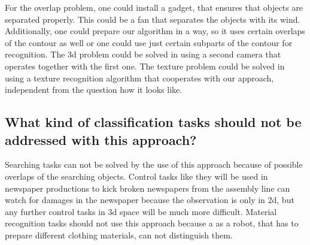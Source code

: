 \documentclass[a4paper,headings=small]{scrartcl}
\numberwithin{equation}{section} %
\numberwithin{figure}{section}   %
\begin{document}
For the overlap problem, one could install a gadget, that ensures that objects are separated properly.
This could be a fan that separates the objects with its wind. 
Additionally, one could prepare our algorithm in a way, so it uses certain overlaps of the 
contour as well or one could use just certain subparts of the contour for recognition.
The 3d problem could be solved in using a second camera that operates together with the first one.
The texture problem could be solved in using a texture recognition algorithm that cooperates with
our approach, independent from the question how it looks like.

\subsection{What kind of classification tasks should not be addressed with
this approach?}

Searching tasks can not be solved by the use of this approach because of possible overlaps
of the searching objects.
Control tasks like they will be used in newspaper productions to kick broken newspapers from
the assembly line can watch for damages in the newspaper because the observation is only in 2d,
but any further control tasks in 3d space will be much more difficult.
Material recognition tasks should not use this approach 
because a as a robot, that has to prepare different clothing materials, can not distinguish them.
\end{document}
